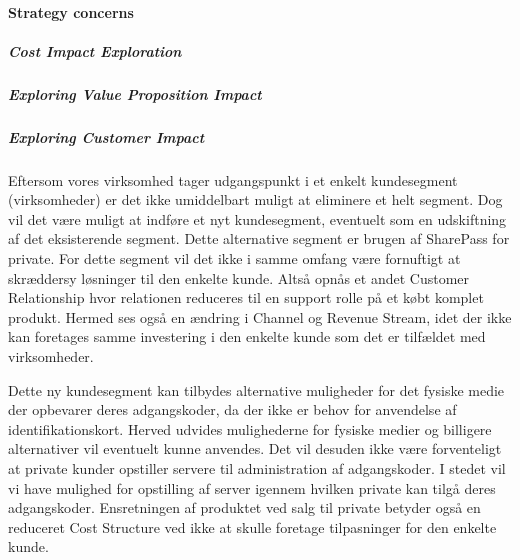 \paragraph{Strategy concerns}

\subparagraph{Cost Impact Exploration}


\subparagraph{Exploring Value Proposition Impact}


\subparagraph{Exploring Customer Impact}
Eftersom vores virksomhed tager udgangspunkt i et enkelt kundesegment (virksomheder) er det ikke umiddelbart muligt at eliminere et helt segment.
Dog vil det være muligt at indføre et nyt kundesegment, eventuelt som en udskiftning af det eksisterende segment.
Dette alternative segment er brugen af SharePass for private.
For dette segment vil det ikke i samme omfang være fornuftigt at skræddersy løsninger til den enkelte kunde.
Altså opnås et andet Customer Relationship hvor relationen reduceres til en support rolle på et købt komplet produkt.
Hermed ses også en ændring i Channel og Revenue Stream, idet der ikke kan foretages samme investering i den enkelte kunde som det er tilfældet med virksomheder.

Dette ny kundesegment kan tilbydes alternative muligheder for det fysiske medie der opbevarer deres adgangskoder, da der ikke er behov for anvendelse af identifikationskort.
Herved udvides mulighederne for fysiske medier og billigere alternativer vil eventuelt kunne anvendes.
Det vil desuden ikke være forventeligt at private kunder opstiller servere til administration af adgangskoder.
I stedet vil vi have mulighed for opstilling af server igennem hvilken private kan tilgå deres adgangskoder.
Ensretningen af produktet ved salg til private betyder også en reduceret Cost Structure ved ikke at skulle foretage tilpasninger for den enkelte kunde.

